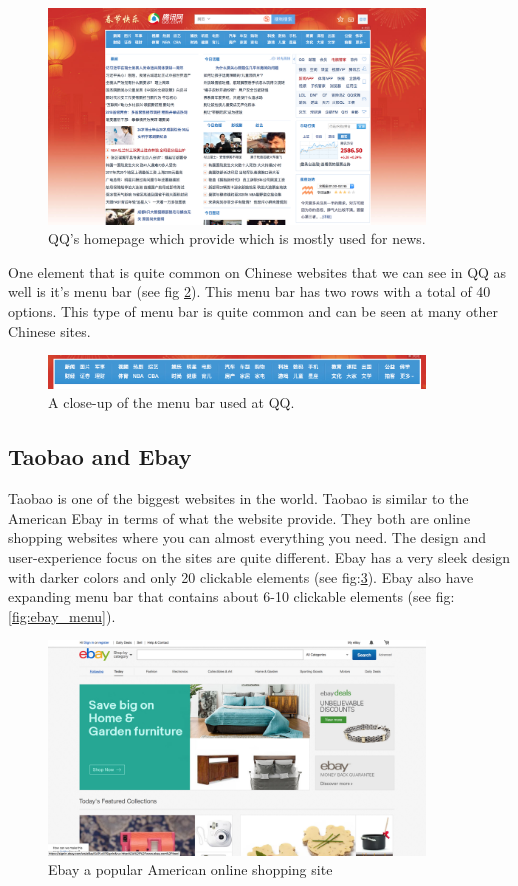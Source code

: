 \begin{figure}[h]
\centering
\includegraphics[width=100mm]{Images/QQ.png}
\decoRule
\caption[QQ.com]{QQ's homepage which provide which is mostly used for news.}
\label{fig:QQ.com}
\end{figure}

One element that is quite common on Chinese websites that we can see in QQ as well is it's menu bar (see fig \ref{fig:QQ_menubar}). This menu bar has two rows with a total of 40 options. This type of menu bar is quite common and can be seen at many other Chinese sites.


\begin{figure}[h]
\centering
\includegraphics[width=100mm]{Images/QQ_menubar.png}
\decoRule
\caption[QQ's Menu bar]{A close-up of the menu bar used at QQ.}
\label{fig:QQ_menubar}
\end{figure}

\subsection{Taobao and Ebay}
Taobao is one of the biggest websites in the world. Taobao is similar to the American Ebay in terms of what the website provide. They both are online shopping websites where you can almost everything you need. The design and user-experience focus on the sites are quite different. Ebay has a very sleek design with darker colors and only 20 clickable elements (see fig:\ref{fig:ebay}). Ebay also have expanding menu bar that contains about 6-10 clickable elements (see fig:\ref{fig:ebay_menu}).

\begin{figure}[h]
\centering
\includegraphics[width=100mm]{Images/ebay.png}
\decoRule
\caption[ebay]{Ebay a popular American online shopping site}
\label{fig:ebay}
\end{figure}

